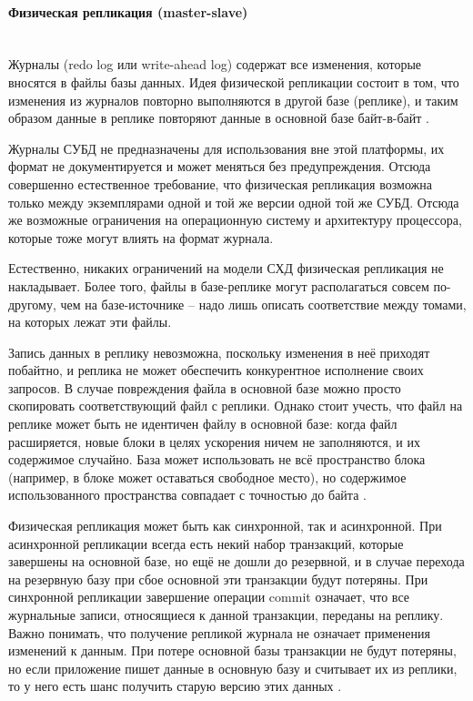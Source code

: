 \paragraph{Физическая репликация (master-slave)} ~\\
Журналы (redo log или write-ahead log) содержат все изменения, которые вносятся в файлы базы данных. Идея физической
репликации состоит в том, что изменения из журналов повторно выполняются в другой базе (реплике), и таким образом данные
в реплике повторяют данные в основной базе байт-в-байт \autocite{PhysLogPeplic}.

Журналы СУБД не предназначены для использования вне этой платформы, их формат не документируется и может меняться без
предупреждения. Отсюда совершенно естественное требование, что физическая репликация возможна только между экземплярами
одной и той же версии одной той же СУБД. Отсюда же возможные ограничения на операционную систему и архитектуру
процессора, которые тоже могут влиять на формат журнала.

Естественно, никаких ограничений на модели СХД физическая репликация не накладывает. Более того, файлы в базе-реплике
могут располагаться совсем по-другому, чем на базе-источнике – надо лишь описать соответствие между томами, на которых
лежат эти файлы.

Запись данных в реплику невозможна, поскольку изменения в неё приходят побайтно, и реплика не может обеспечить
конкурентное исполнение своих запросов. В случае повреждения файла в основной базе можно просто скопировать
соответствующий файл с реплики. Однако стоит учесть, что файл на реплике может быть не идентичен файлу в основной базе:
когда файл расширяется, новые блоки в целях ускорения ничем не заполняются, и их содержимое случайно. База может
использовать не всё пространство блока (например, в блоке может оставаться свободное место), но содержимое
использованного пространства совпадает с точностью до байта \autocite{PhysLogPeplic}.

Физическая репликация может быть как синхронной, так и асинхронной. При асинхронной репликации всегда есть некий набор
транзакций, которые завершены на основной базе, но ещё не дошли до резервной, и в случае перехода на резервную базу при
сбое основной эти транзакции будут потеряны. При синхронной репликации завершение операции commit означает, что все
журнальные записи, относящиеся к данной транзакции, переданы на реплику. Важно понимать, что получение репликой журнала
не означает применения изменений к данным. При потере основной базы транзакции не будут потеряны, но если приложение
пишет данные в основную базу и считывает их из реплики, то у него есть шанс получить старую версию этих данных \autocite{PhysLogPeplic}.

